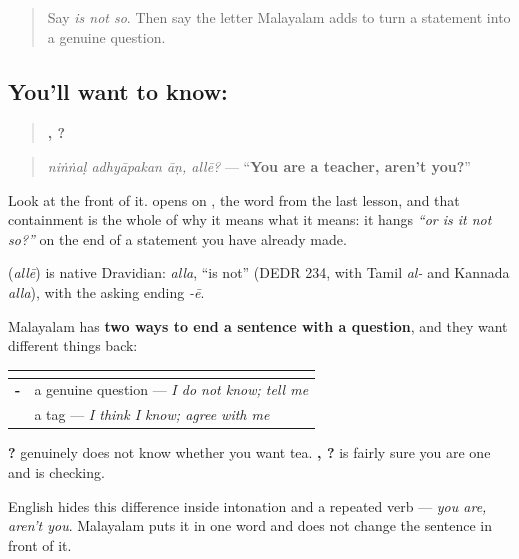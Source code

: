 \label{lesson:ML-C77-alle}



\begin{quote}
Say \emph{is not so}. Then say the letter Malayalam adds to turn a statement into a genuine question.
\end{quote}

\subsection*{You'll want to know: }
\begin{quote}
\textbf{  , ?}
\end{quote}

\begin{quote}
\emph{niṅṅaḷ adhyāpakan āṇ, allē?} — \textquotedblleft{}\textbf{You are a teacher, aren't you?}\textquotedblright{}
\end{quote}

Look at the front of it. \textbf{} opens on \textbf{}, the word from the last lesson, and that containment is the whole of why it means what it means: it hangs \emph{\textquotedblleft{}or is it not so?\textquotedblright{}} on the end of a statement you have already made.

\begin{cousinweb}
\textbf{} (\emph{allē}) is native Dravidian: \emph{alla}, \textquotedblleft{}is not\textquotedblright{} (DEDR 234, with Tamil \emph{al-} and Kannada \emph{alla}), with the asking ending \emph{-ē}.
\end{cousinweb}

\begin{grammarlens}[title={Grammar Lens: asking, and asking for agreement}]
Malayalam has \textbf{two ways to end a sentence with a question}, and they want different things back:

\noindent
\begin{tabularx}{\linewidth}{@{}>{\raggedright\arraybackslash}X>{\raggedright\arraybackslash}X@{}}
\toprule
\textbf{} & \textbf{} \\
\midrule
\textbf{-\ml{ഓ}} & a genuine question — \emph{I do not know; tell me} \\
\textbf{\ml{അല്ലേ}} & a tag — \emph{I think I know; agree with me} \\
\bottomrule
\end{tabularx}

\textbf{ ?} genuinely does not know whether you want tea. \textbf{  , ?} is fairly sure you are one and is checking.

English hides this difference inside intonation and a repeated verb — \emph{you are, aren't you}. Malayalam puts it in one word and does not change the sentence in front of it.
\end{grammarlens}

